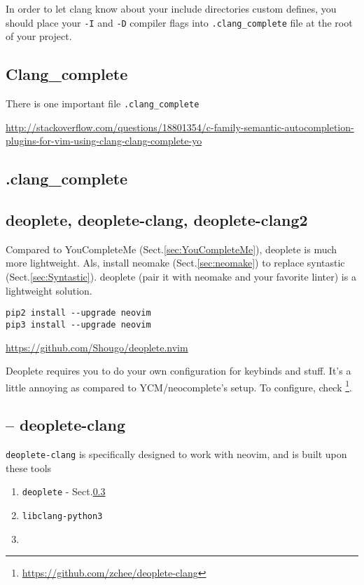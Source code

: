 In order to let clang know about your include directories custom defines, you
should place your \verb!-I! and \verb!-D! compiler flags into
\verb!.clang_complete! file at the root of your project.
\subsection{Clang\_complete}
\label{sec:clang_complete}

There is one important file \verb!.clang_complete!

\url{http://stackoverflow.com/questions/18801354/c-family-semantic-autocompletion-plugins-for-vim-using-clang-clang-complete-yo}

\subsection{.clang\_complete}
 \label{sec:.clang_complete}
 



\subsection{deoplete, deoplete-clang, deoplete-clang2}
\label{sec:deoplete}

Compared to YouCompleteMe (Sect.\ref{sec:YouCompleteMe}), deoplete is much more
lightweight. Als, install neomake (Sect.\ref{sec:neomake}) to replace syntastic
(Sect.\ref{sec:Syntastic}). deoplete (pair it with neomake and your favorite
linter) is a lightweight solution.

\begin{verbatim}
pip2 install --upgrade neovim
pip3 install --upgrade neovim
\end{verbatim}
\url{https://github.com/Shougo/deoplete.nvim}

Deoplete requires you to do your own configuration for keybinds and stuff. It's
a little annoying as compared to YCM/neocomplete's setup.
To configure, check
\footnote{\url{https://github.com/zchee/deoplete-clang}}.

\subsection{-- deoplete-clang}
\label{sec:deoplete-clang}

\verb!deoplete-clang! is specifically designed to work with neovim, and is built
upon these tools
\begin{enumerate}
  \item \verb!deoplete! - Sect.\ref{sec:deoplete}
  \item \verb!libclang-python3!
  \item 
\end{enumerate}


